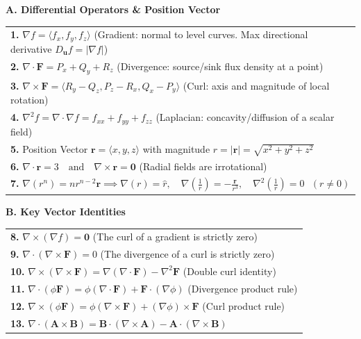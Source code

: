 \documentclass[10pt, landscape, twocolumn]{article}
\begin{document}
{\color{themeblue}\normalsize\bfseries A. Differential Operators \& Position Vector} \par
\vspace{-0.2em}
\begin{tabularx}{\linewidth}{|X|}
\hline
\textbf{1.} $\nabla f = \langle f_x, f_y, f_z \rangle$ (Gradient: normal to level curves. Max directional derivative $D_{\mathbf{u}}f = |\nabla f|$) \\
\textbf{2.} $\nabla \cdot \mathbf{F} = P_x + Q_y + R_z$ (Divergence: source/sink flux density at a point) \\
\textbf{3.} $\nabla \times \mathbf{F} = \langle R_y-Q_z, P_z-R_x, Q_x-P_y \rangle$ (Curl: axis and magnitude of local rotation) \\
\textbf{4.} $\nabla^2 f = \nabla \cdot \nabla f = f_{xx} + f_{yy} + f_{zz}$ (Laplacian: concavity/diffusion of a scalar field) \\
\textbf{5.} Position Vector $\mathbf{r} = \langle x, y, z \rangle$ with magnitude $r = |\mathbf{r}| = \sqrt{x^2+y^2+z^2}$ \\
\textbf{6.} $\nabla \cdot \mathbf{r} = 3 \quad \text{and} \quad \nabla \times \mathbf{r} = \mathbf{0}$ (Radial fields are irrotational) \\
\textbf{7.} $\nabla (r^n) = n r^{n-2} \mathbf{r} \implies \nabla(r) = \hat{r}, \quad \nabla\left(\frac{1}{r}\right) = -\frac{\mathbf{r}}{r^3}, \quad \nabla^2\left(\frac{1}{r}\right) = 0 \text{ } (r \neq 0)$ \\
\hline
\end{tabularx}

\vspace{0.6em}
{\color{themeblue}\normalsize\bfseries B. Key Vector Identities} \par
\vspace{-0.2em}
\begin{tabularx}{\linewidth}{|X|}
\hline
\textbf{8.} $\nabla \times (\nabla f) = \mathbf{0}$ (The curl of a gradient is strictly zero) \\
\textbf{9.} $\nabla \cdot (\nabla \times \mathbf{F}) = 0$ (The divergence of a curl is strictly zero) \\
\textbf{10.} $\nabla \times (\nabla \times \mathbf{F}) = \nabla(\nabla \cdot \mathbf{F}) - \nabla^2\mathbf{F}$ (Double curl identity) \\
\textbf{11.} $\nabla \cdot (\phi \mathbf{F}) = \phi(\nabla \cdot \mathbf{F}) + \mathbf{F} \cdot (\nabla \phi)$ (Divergence product rule) \\
\textbf{12.} $\nabla \times (\phi \mathbf{F}) = \phi(\nabla \times \mathbf{F}) + (\nabla \phi) \times \mathbf{F}$ (Curl product rule) \\
\textbf{13.} $\nabla \cdot (\mathbf{A} \times \mathbf{B}) = \mathbf{B} \cdot (\nabla \times \mathbf{A}) - \mathbf{A} \cdot (\nabla \times \mathbf{B})$ \\
\hline
\end{tabularx}
\end{document}
